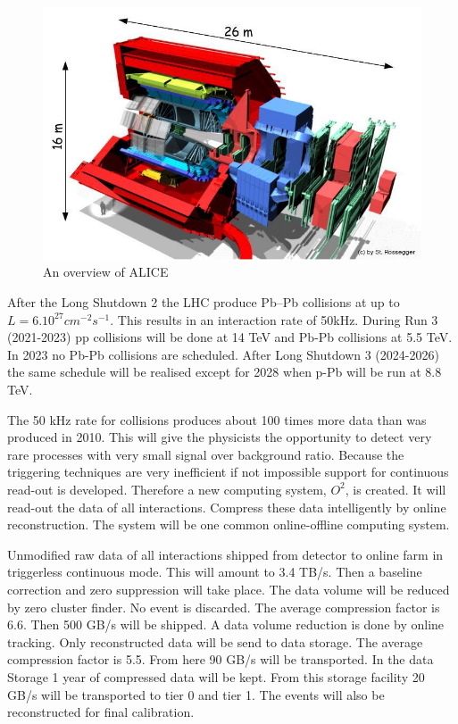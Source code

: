 \begin{figure}[h]
  \begin{center}
    \includegraphics[scale=0.4]{./images/alice_upgrade.jpg}
    \caption{An overview of ALICE}
    \label{fig:overview}
  \end{center}
\end{figure}
After the Long Shutdown 2 the LHC produce Pb–Pb collisions at up to $L = 6.10^{27} cm^{-2} s^{-1}$. This results in an interaction rate of 50kHz. During Run 3 (2021-2023) pp collisions will be done at 14 TeV and Pb-Pb collisions at 5.5 TeV. In 2023 no Pb-Pb collisions are scheduled. After Long Shutdown 3 (2024-2026) the same schedule will be realised except for 2028 when p-Pb will be run at 8.8 TeV.

The 50 kHz rate for collisions produces about 100 times more data than was produced in 2010. This will give the physicists the opportunity to detect very rare processes with very small signal over background ratio. Because the triggering techniques are very inefficient if not impossible support for continuous read-out is developed. Therefore a new computing system, $O^2$, is created. It will read-out the data of all interactions. Compress these data intelligently by online reconstruction. The system will be one common online-offline computing system.

Unmodified raw data of all interactions shipped from detector to online farm in triggerless continuous mode. This will amount to 3.4 TB/s. Then a baseline correction and zero suppression will take place. The data volume will be reduced by zero cluster finder. No event is discarded. The average compression factor is 6.6. Then 500 GB/s will be shipped. A data volume reduction is done by online tracking. Only reconstructed data will be send to data storage. The average compression factor is 5.5. From here 90 GB/s will be transported. In the data Storage 1 year of compressed data will be kept. From this storage facility 20 GB/s will be transported to tier 0 and tier 1. The events will also be reconstructed for final calibration.

